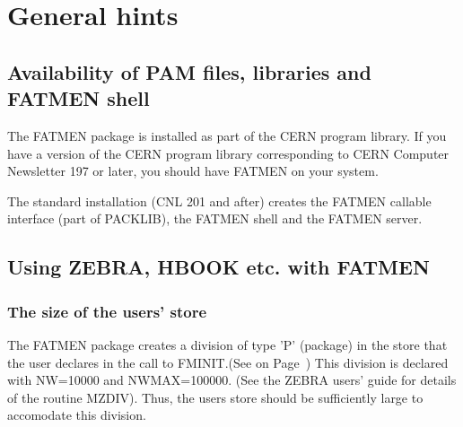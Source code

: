 
\chapter{General hints}
\section{Availability of PAM files, libraries and FATMEN shell}
\par
The FATMEN package is installed as part of the CERN program library.
If you have a version of the CERN program library corresponding
to CERN Computer Newsletter 197 or later, you should have FATMEN
on your system.
\par
{}
\par
The standard installation (CNL 201 and after) creates the FATMEN
callable interface (part of PACKLIB), the FATMEN shell and the
FATMEN server.
\section{Using ZEBRA, HBOOK etc. with FATMEN}
\subsection{The size of the users' store}
\par
{}
The FATMEN package creates a division of type 'P' (package)
in the store that the user declares in the call to
FMINIT.(See on Page~\pageref{FMINIT}) This division
is declared with NW=10000 and NWMAX=100000. (See the ZEBRA users'
guide\cite{bib-ZEBRA} for details of the routine MZDIV).
Thus, the users store should be sufficiently large to accomodate
this division.

